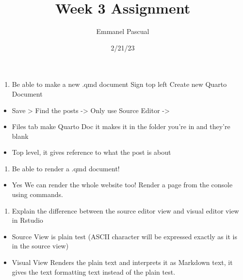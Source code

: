 \documentclass[
  letterpaper,
  DIV=11,
  numbers=noendperiod]{scrartcl}
\title{Week 3 Assignment}
\author{Emmanel Pascual}
\date{2/21/23}
\providecommand{\tightlist}{%
  \setlength{\itemsep}{0pt}\setlength{\parskip}{0pt}}\usepackage{longtable,booktabs,array}
\renewcommand*\contentsname{Table of contents}
\newcommand\contentsname{Table of contents}
\begin{document}
\maketitle
\ifdefined\Shaded\renewenvironment{Shaded}{\begin{tcolorbox}[interior hidden, sharp corners, enhanced, breakable, borderline west={3pt}{0pt}{shadecolor}, frame hidden, boxrule=0pt]}{\end{tcolorbox}}\fi

\renewcommand*\contentsname{Table of contents}
{
\hypersetup{linkcolor=}
\setcounter{tocdepth}{2}
\tableofcontents
}
\begin{enumerate}
\def\labelenumi{\arabic{enumi}.}
\tightlist
\item
  Be able to make a new .qmd document Sign top left Create new Quarto
  Document
\end{enumerate}

\begin{itemize}
\item
  Save \textgreater{} Find the posts -\textgreater{} Only use Source
  Editor -\textgreater{}
\item
  Files tab make Quarto Doc it makes it in the folder you're in and
  they're blank
\item
  Top level, it gives reference to what the post is about
\end{itemize}

\begin{enumerate}
\def\labelenumi{\arabic{enumi}.}
\setcounter{enumi}{1}
\tightlist
\item
  Be able to render a .qmd document!
\end{enumerate}

\begin{itemize}
\tightlist
\item
  Yes We can render the whole website too! Render a page from the
  console using commands.
\end{itemize}

\begin{enumerate}
\def\labelenumi{\arabic{enumi}.}
\setcounter{enumi}{2}
\tightlist
\item
  Explain the difference between the source editor view and visual
  editor view in Rstudio
\end{enumerate}

\begin{itemize}
\item
  Source View is plain test (ASCII character will be expressed exactly
  as it is in the source view)
\item
  Visual View Renders the plain text and interprets it as Markdown text,
  it gives the text formatting text instead of the plain test.
\end{itemize}
\end{document}
